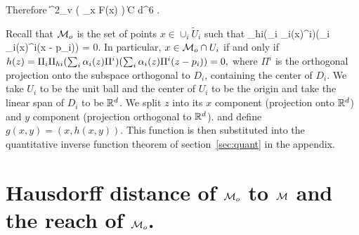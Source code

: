 \documentclass[final, 12pt]{colt2018} %
\begin{document}
Therefore \beq{} \left\| \partial^2_v \left(  \Pi_x F(x) \right) \right\| \leq C d^6 \de.\eeq


Recall that $\mathcal M_o$ is the set of points $x \in \cup_i  \tilde{U}_i$ such that 
\beq \Pi_{hi}(\sum_i \a_i(x)\Pi^i)(\sum_i \a_i(x)\Pi^i(x - p_i)) = 0. \eeq
In particular, $x \in \mathcal M_o \cap U_i$ if and only if $ h(z) = \Pi_i \Pi_{hi}(\sum_i \alpha_i(z)\Pi^i)(\sum_i \alpha_i(z)\Pi^i(z - p_i)) = 0,$ where $\Pi^i$ is the orthogonal projection onto the subspace orthogonal to $D_i$, containing the center of $D_i$. We take $U_i$ to be the unit ball and the center of $U_i$ to be the origin and take the linear span of $D_i$ to be $\mathbb R^d$.  We split $z$ into its $x$ component (projection onto $\mathbb R^d$) and $y$ component (projection orthogonal to $\mathbb R^d$). and define $g(x, y) = (x, h(x, y))$. This function is then substituted into the quantitative inverse function theorem of section~\ref{sec:quant} in the appendix.
\section{Hausdorff distance of $\mathcal M_o$ to $\mathcal M$ and the reach of $\mathcal M_o$.}
\end{document}
